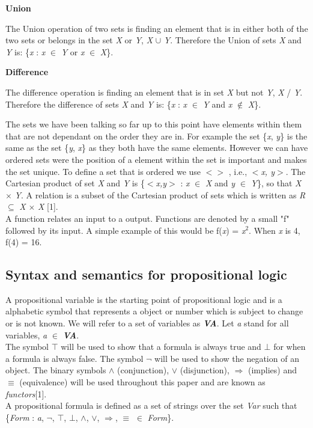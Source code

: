 \documentclass[11pt,a4paper]{article}
\begin{document}
\textbf{Union}

\indent The Union operation of two sets is finding an element that is in either both of the two sets or belongs in the set \textit{X} or \textit{Y}, \textit{X} $\cup$ \textit{Y}. Therefore the Union of sets \textit{X} and \textit{Y} is: \{\textit{x} : \textit{x} $\in$ \textit{Y} or \textit{x} $\in$ \textit{X}\}. \newline

\textbf{Difference}

\indent The difference operation is finding an element that is in set \textit{X} but not \textit{Y}, \textit{X} / \textit{Y}. Therefore the difference of sets \textit{X} and \textit{Y} is: \{\textit{x} : \textit{x} $\in$ \textit{Y} and \textit{x} $\not \in$ \textit{X}\}.

The sets we have been talking so far up to this point have elements within them that are not dependant on the order they are in. For example the set \{\textit{x}, \textit{y}\} is the same as the set \{\textit{y}, \textit{x}\} as they both have the same elements. However we can have ordered sets were the position of a element within the set is important and makes the set unique. To define a set that is ordered we use $<> $ , i.e., $<$\textit{x, y}$>$. \newline
The Cartesian product of set \textit{X} and \textit{Y} is \{$<$\textit{x,y}$>$ : \textit{x} $\in$ \textit{X} and \textit{y} $\in$ \textit{Y}\}, so that \textit{X} $\times$ \textit{Y}.\newline
A relation is a subset of the Cartesian product of sets which is written as \textit{R} $\subseteq$ \textit{X} $\times$ \textit{X} [1].\\

A function relates an input to a output. Functions are denoted by a small "f" followed by its input. A simple example of this would be f(\textit{x}) = \textit{x}$^2$. When \textit{x} is 4, f(4) = {16}.



\newpage
\subsection{Syntax and semantics for propositional logic}
A propositional variable is the starting point of propositional logic and is a alphabetic symbol that represents a object or number which is subject to change or is not known. We will refer to a set of variables as \textit{\textbf{VA}}. Let \textit{a} stand for all variables, \textit{a} $\in$ \textit{\textbf{VA}}.\\
The symbol $\top$ will be used to show that a formula is always true and $\bot$ for when a formula is always false. The symbol $\neg$ will be used to show the negation of an object. The binary symbols $\land$ (conjunction), $\lor$ (disjunction), $\Rightarrow$ (implies) and $\equiv$ (equivalence) will be used throughout this paper and are known as \textit{functors}[1].  \\
\noindent A propositional formula is defined as a set of strings over the set \textit{Var} such that \{\textit{Form} : \textit{a}, $\neg$, $\top$, $\bot$, $\land$, $\lor$, $\Rightarrow$, $\equiv$ $\in$ \textit{Form}\}. \\
\end{document}
